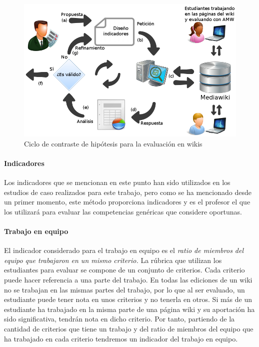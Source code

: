 \begin{figure}
  \begin{center}
    \includegraphics[scale=0.45]{AmwDiagram2.png}
  \end{center}
  \caption{Ciclo de contraste de hipótesis para la evaluación en wikis}
  \label{fig:AmwDiagram2}
\end{figure}

\paragraph{Indicadores}

Los indicadores que se mencionan en este punto han sido utilizados en los estudios de caso realizados para este trabajo, pero como se ha mencionado desde un primer momento, este método proporciona indicadores y es el profesor el que los utilizará para evaluar las competencias genéricas que considere oportunas.

\paragraph*{Trabajo en equipo}
El indicador considerado para el trabajo en equipo es el \emph{ratio de miembros del equipo que trabajaron en un mismo criterio.} La rúbrica que utilizan los estudiantes para evaluar se compone de un conjunto de criterios. Cada criterio puede hacer referencia a una parte del trabajo. En todas las ediciones de un wiki no se trabajan en las mismas partes del trabajo, por lo que al ser evaluado, un estudiante puede tener nota en unos criterios y no tenerla en otros. Si más de un estudiante ha trabajado en la misma parte de una página wiki y su aportación ha sido significativa, tendrán nota en dicho criterio. Por tanto, partiendo de la cantidad de criterios que tiene un trabajo y del ratio de miembros del equipo que ha trabajado en cada criterio tendremos un indicador del trabajo en equipo.

